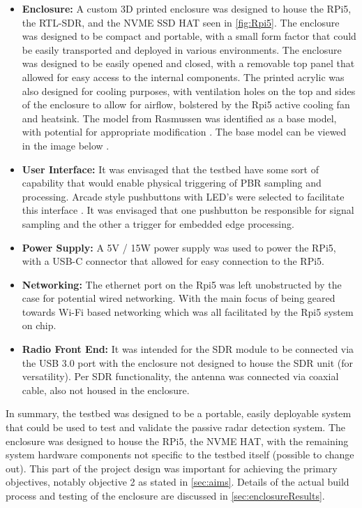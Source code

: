 \begin{itemize}
    \item \textbf{Enclosure:} A custom 3D printed enclosure was designed to house the RPi5, the RTL-SDR, and the NVME SSD HAT seen in \ref{fig:Rpi5}. The enclosure was designed to be compact and portable, with a small form factor that could be easily transported and deployed in various environments. The enclosure was designed to be easily opened and closed, with a removable top panel that allowed for easy access to the internal components. The printed acrylic was also designed for cooling purposes, with ventilation holes on the top and sides of the enclosure to allow for airflow, bolstered by the Rpi5 active cooling fan and heatsink. The model from Rasmussen was identified as a base model, with potential for appropriate modification \cite{RPiCase}. The base model can be viewed in the image below .
    \item \textbf{User Interface:} It was envisaged that the testbed have some sort of capability that would enable physical triggering of PBR sampling and processing. Arcade style pushbuttons with LED's were selected to facilitate this interface \cite{pushbuttons}. It was envisaged that one pushbutton be responsible for signal sampling and the other a trigger for embedded edge processing. 
    \item \textbf{Power Supply:} A 5V / 15W power supply was used to power the RPi5, with a USB-C connector that allowed for easy connection to the RPi5. 
    \item \textbf{Networking:} The ethernet port on the Rpi5 was left unobstructed by the case for potential wired networking. With the main focus of being geared towards Wi-Fi based networking which was all facilitated by the Rpi5 system on chip.
    \item \textbf{Radio Front End:} It was intended for the SDR module to be connected via the USB 3.0 port with the enclosure not designed to house the SDR unit (for versatility). Per SDR functionality, the antenna was connected via coaxial cable, also not housed in the enclosure. 
    
\end{itemize}

In summary, the testbed was designed to be a portable, easily deployable system that could be used to test and validate the passive radar detection system. The enclosure was designed to house the RPi5, the NVME HAT, with the remaining system hardware components not specific to the testbed itself (possible to change out). This part of the project design was important for achieving the primary objectives, notably objective 2 as stated in \ref{sec:aims}. Details of the actual build process and testing of the enclosure are discussed in \ref{sec:enclosureResults}.

